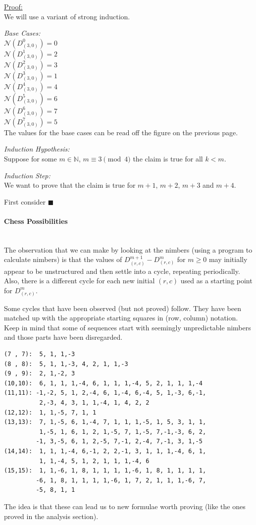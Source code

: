 \documentclass{article}
\newcommand{\N}{\mathbb{N}}
\newcommand{\I}[1]{\textit{#1}}
\newcommand{\nim}{\mathcal{N}}
\newcommand{\D}[2]{D_{#1}^{#2}}
\newenvironment{claimproof}[1]{\par\noindent\underline{Proof:}\space#1}
{\hfill $\blacksquare$}
\begin{document}
\begin{claimproof}\mbox{}\\
We will use a variant of strong induction.
\medskip

\I{Base Cases:} \\
$\nim(\D{(3,0)}{0}) = 0$ \\
$\nim(\D{(3,0)}{1}) = 2$ \\
$\nim(\D{(3,0)}{2}) = 3$ \\
$\nim(\D{(3,0)}{3}) = 1$ \\
$\nim(\D{(3,0)}{4}) = 4$ \\
$\nim(\D{(3,0)}{5}) = 6$ \\
$\nim(\D{(3,0)}{6}) = 7$ \\
$\nim(\D{(3,0)}{7}) = 5$ \\
The values for the base cases can be read off the
figure on the previous page.
\medskip

\I{Induction Hypothesis:} \\
Suppose for some $m \in \N$, $m \equiv 3 \pmod{4}$
the claim is true for all $k < m$.
\medskip

\I{Induction Step:} \\
We want to prove that the claim is true for $m + 1$, $m + 2$,
$m + 3$ and $m + 4$.
\medskip

First consider 
\end{claimproof}
\newpage

\paragraph{Chess Possibilities}\mbox{}\\
The observation that we can make by looking at the nimbers
(using a program to calculate nimbers) is that the values
of $\D{(r,c)}{m+1}-\D{(r,c)}{m}$ for $m \geq 0$ may initially
appear to be unstructured and then settle into a cycle,
repeating periodically. Also, there is a different cycle for
each new initial $(r,c)$ used as a starting point for
$\D{(r,c)}{m}$.
\bigskip

Some cycles that have been observed (but not proved) follow. They have
been matched up with the appropriate starting squares in (row, column)
notation. Keep in mind that some of sequences start with seemingly
unpredictable nimbers and those parts have been disregarded.
\begin{verbatim}
(7 , 7):  5, 1, 1,-3
(8 , 8):  5, 1, 1,-3, 4, 2, 1, 1,-3
(9 , 9):  2, 1,-2, 3 
(10,10):  6, 1, 1, 1,-4, 6, 1, 1, 1,-4, 5, 2, 1, 1, 1,-4 
(11,11): -1,-2, 5, 1, 2,-4, 6, 1,-4, 6,-4, 5, 1,-3, 6,-1, 
          2,-3, 4, 3, 1, 1,-4, 1, 4, 2, 2 
(12,12):  1, 1,-5, 7, 1, 1 
(13,13):  7, 1,-5, 6, 1,-4, 7, 1, 1, 1,-5, 1, 5, 3, 1, 1,
          1,-5, 1, 6, 1, 2, 1,-5, 7, 1,-5, 7,-1,-3, 6, 2,
         -1, 3,-5, 6, 1, 2,-5, 7,-1, 2,-4, 7,-1, 3, 1,-5
(14,14):  1, 1, 1,-4, 6,-1, 2, 2,-1, 3, 1, 1, 1,-4, 6, 1, 
          1, 1,-4, 5, 1, 2, 1, 1, 1,-4, 6
(15,15):  1, 1,-6, 1, 8, 1, 1, 1, 1,-6, 1, 8, 1, 1, 1, 1,
         -6, 1, 8, 1, 1, 1, 1,-6, 1, 7, 2, 1, 1, 1,-6, 7,
         -5, 8, 1, 1 
\end{verbatim}
\bigskip

The idea is that these can lead us to new formulae worth proving
(like the ones proved in the analysis section).
\end{document}

